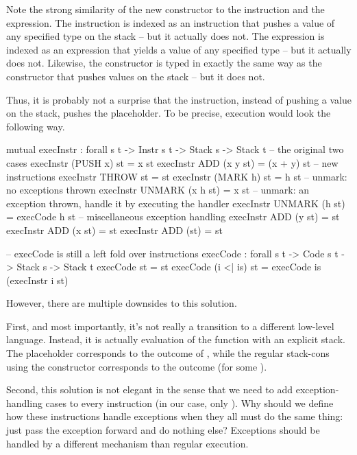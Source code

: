 Note the strong similarity of the new constructor \ident{\void\scons\_} to the
 instruction and the 
expression. The instruction  is indexed as an instruction that pushes
a value of any specified type on the stack -- but it actually does not. The 
 expression is indexed as an expression that yields a value of any specified
type -- but it actually does not. Likewise, the \ident{\void} constructor is typed in
exactly the same way as the constructor that pushes values on the stack -- but it does not.

Thus, it is probably not a surprise that the  instruction, instead of pushing
a value on the stack, pushes the \ident{\void} placeholder. To be precise, execution would
look the following way. \label{sec:placeholder}
\begin{code}
  mutual
    execInstr : forall {s t} -> Instr s t -> Stack s -> Stack t
    -- the original two cases
    execInstr (PUSH x) st = x \scons st
    execInstr ADD (x \scons y \scons st) = (x + y) \scons st
    -- new instructions
    execInstr THROW st = \void\scons st
    execInstr (MARK h) st = h \sconsh st
    -- unmark: no exceptions thrown
    execInstr UNMARK (x \scons h \sconsh st) = x \scons st
    -- unmark: an exception thrown, handle it by executing the handler
    execInstr UNMARK (\void\scons h \sconsh st) = execCode h st
    -- miscellaneous exception handling
    execInstr ADD (\void\scons y \scons st) = \void\scons st
    execInstr ADD (x \scons \void\scons st) = \void\scons st
    execInstr ADD (\void\scons \void\scons st) = \void\scons st

    -- execCode is still a left fold over instructions
    execCode : forall {s t} -> Code s t -> Stack s -> Stack t
    execCode \nil st = st
    execCode (i <| is) st = execCode is (execInstr i st)
\end{code}

\noindent However, there are multiple downsides to this solution.%
\label{sec:placeholders-objections}

First, and most importantly, it's not really a transition to a different
low-level language.  Instead, it is actually evaluation of the function
 with an explicit stack. The placeholder \ident{\void}
corresponds to the outcome  of , while the regular
stack-cons using the constructor \ident{\scons\!\!} corresponds to the outcome
 (for some ).

Second, this solution is not elegant in the sense that we need to add
exception-handling cases to every instruction (in our case, only ).
Why should we define how these instructions handle exceptions when they all
must do the same thing: just pass the exception forward and do nothing else?
Exceptions should be handled by a different mechanism than regular execution.

